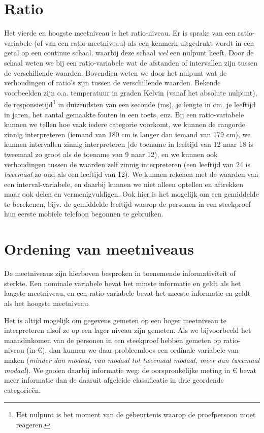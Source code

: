 \documentclass[
]{book}
\begin{document}
\hypertarget{sec:ratio}{%
\section{Ratio}\label{sec:ratio}}

Het vierde en hoogste meetniveau is het ratio-niveau. Er is sprake van
een ratio-variabele (of van een ratio-meetniveau) als een kenmerk
uitgedrukt wordt in een getal op een continue schaal, waarbij deze
schaal \emph{wel} een nulpunt heeft. Door de schaal weten we bij een
ratio-variabele wat de afstanden of intervallen zijn tussen de
verschillende waarden. Bovendien weten we door het nulpunt wat de
verhoudingen of ratio's zijn tussen de verschillende waarden. Bekende
voorbeelden zijn o.a. temperatuur in graden Kelvin (vanaf het absolute
nulpunt), de responsietijd\footnote{Het nulpunt is het moment van de gebeurtenis waarop de proefpersoon moet reageren.} in duizendsten van een seconde (ms), je
lengte in cm, je leeftijd in jaren, het aantal gemaakte fouten in een
toets, enz. Bij een ratio-variabele kunnen we tellen hoe vaak iedere
categorie voorkomt, we kunnen de rangorde zinnig interpreteren (iemand
van 180 cm is langer dan iemand van 179 cm), we kunnen intervallen
zinnig interpreteren (de toename in leeftijd van 12 naar 18 is tweemaal
zo groot als de toename van 9 naar 12), en we kunnen ook verhoudingen
tussen de waarden zelf zinnig interpreteren (een leeftijd van 24 is
\emph{tweemaal} zo oud als een leeftijd van 12). We kunnen rekenen met de
waarden van een interval-variabele, en daarbij kunnen we niet alleen
optellen en aftrekken maar ook delen en vermenigvuldigen. Ook hier is
het mogelijk om een gemiddelde te berekenen, bijv. de gemiddelde leeftijd
waarop de personen in een steekproef hun eerste mobiele telefoon begonnen te gebruiken.

\hypertarget{sec:ordeningvanmeetniveaus}{%
\section{Ordening van meetniveaus}\label{sec:ordeningvanmeetniveaus}}

De meetniveaus zijn hierboven besproken in toenemende informativiteit of
sterkte. Een nominale variabele bevat het minste informatie en geldt als
het laagste meetniveau, en een ratio-variabele bevat het meeste
informatie en geldt als het hoogste meetniveau.

Het is altijd mogelijk om gegevens gemeten op een hoger meetniveau te
interpreteren alsof ze op een lager niveau zijn gemeten. Als we
bijvoorbeeld het maandinkomen van de personen in een steekproef hebben
gemeten op ratio-niveau (in €), dan kunnen we daar probleemloos een
ordinale variabele van maken (\emph{minder dan modaal, van modaal tot
tweemaal modaal, meer dan tweemaal modaal}). We gooien daarbij
informatie weg: de oorspronkelijke meting in € bevat meer informatie dan
de daaruit afgeleide classificatie in drie geordende categorieën.
\end{document}

